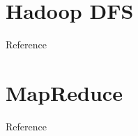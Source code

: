 \section{Hadoop DFS}

Reference \cite{ghemawat2003google, shvachko2010hadoop}

\section{MapReduce}

Reference \cite{dean2008mapreduce}